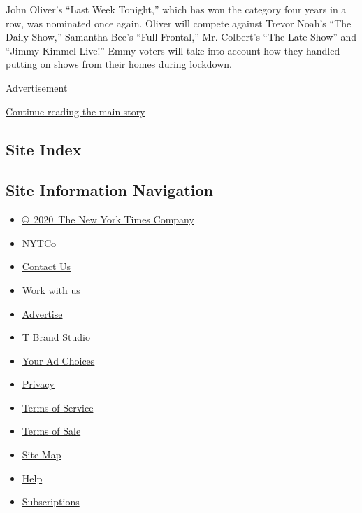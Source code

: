John Oliver's ``Last Week Tonight,'' which has won the category four
years in a row, was nominated once again. Oliver will compete against
Trevor Noah's ``The Daily Show,'' Samantha Bee's ``Full Frontal,'' Mr.
Colbert's ``The Late Show'' and ``Jimmy Kimmel Live!'' Emmy voters will
take into account how they handled putting on shows from their homes
during lockdown.

Advertisement

\protect\hyperlink{after-bottom}{Continue reading the main story}

\hypertarget{site-index}{%
\subsection{Site Index}\label{site-index}}

\hypertarget{site-information-navigation}{%
\subsection{Site Information
Navigation}\label{site-information-navigation}}

\begin{itemize}
\tightlist
\item
  \href{https://help.nytimes.com/hc/en-us/articles/115014792127-Copyright-notice}{©~2020~The
  New York Times Company}
\end{itemize}

\begin{itemize}
\tightlist
\item
  \href{https://www.nytco.com/}{NYTCo}
\item
  \href{https://help.nytimes.com/hc/en-us/articles/115015385887-Contact-Us}{Contact
  Us}
\item
  \href{https://www.nytco.com/careers/}{Work with us}
\item
  \href{https://nytmediakit.com/}{Advertise}
\item
  \href{http://www.tbrandstudio.com/}{T Brand Studio}
\item
  \href{https://www.nytimes.com/privacy/cookie-policy\#how-do-i-manage-trackers}{Your
  Ad Choices}
\item
  \href{https://www.nytimes.com/privacy}{Privacy}
\item
  \href{https://help.nytimes.com/hc/en-us/articles/115014893428-Terms-of-service}{Terms
  of Service}
\item
  \href{https://help.nytimes.com/hc/en-us/articles/115014893968-Terms-of-sale}{Terms
  of Sale}
\item
  \href{https://spiderbites.nytimes.com}{Site Map}
\item
  \href{https://help.nytimes.com/hc/en-us}{Help}
\item
  \href{https://www.nytimes.com/subscription?campaignId=37WXW}{Subscriptions}
\end{itemize}
